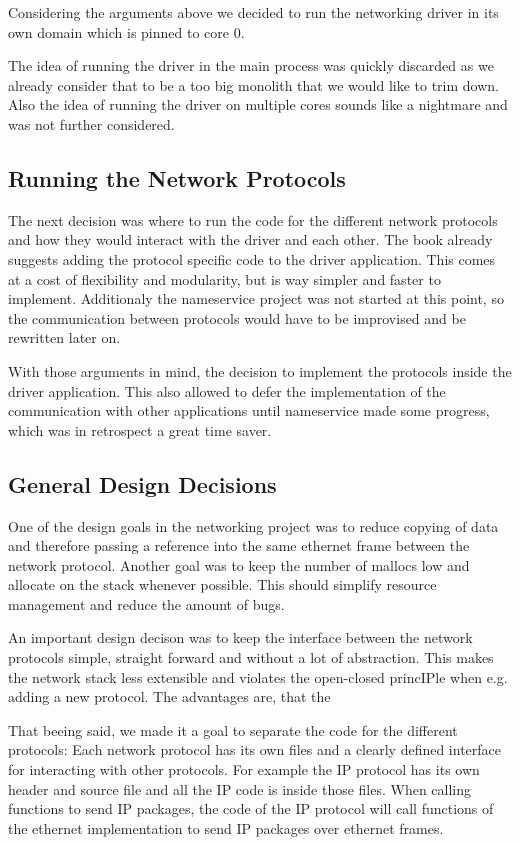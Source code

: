 Considering the arguments above we decided to run the networking driver in its own domain which is pinned to core 0.

The idea of running the driver in the main process was quickly discarded as we already consider that to be a too big monolith that we would like to trim down. Also the idea of running the driver on multiple cores sounds like a nightmare and was not further considered.

\subsection{Running the Network Protocols}

The next decision was where to run the code for the different network protocols and how they would interact with the driver and each other. The book already suggests adding the protocol specific code to the driver application. This comes at a cost of flexibility and modularity, but is way simpler and faster to implement. Additionaly the nameservice project was not started at this point, so the communication between protocols would have to be improvised and be rewritten later on.

With those arguments in mind, the decision to implement the protocols inside the driver application. This also allowed to defer the implementation of the communication with other applications until nameservice made some progress, which was in retrospect a great time saver.

\subsection{General Design Decisions}

One of the design goals in the networking project was to reduce copying of data and therefore passing a reference into the same ethernet frame between the network protocol. Another goal was to keep the number of mallocs low and allocate on the stack whenever possible. This should simplify resource management and reduce the amount of bugs.

An important design decison was to keep the interface between the network protocols simple, straight forward and without a lot of abstraction. This makes the network stack less extensible and violates the open-closed princIPle when e.g. adding a new protocol. The advantages are, that the

That beeing said, we made it a goal to separate the code for the different protocols: Each network protocol has its own files and a clearly defined interface for interacting with other protocols. For example the IP protocol has its own header and source file and all the IP code is inside those files. When calling functions to send IP packages, the code of the IP protocol will call functions of the ethernet implementation to send IP packages over ethernet frames.

